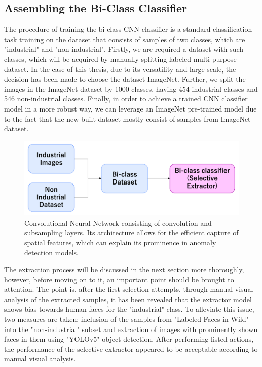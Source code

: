 \subsection{Assembling the Bi-Class Classifier}
\label{bi-class assemble}
The procedure of training the bi-class CNN classifier is a standard classification task training on the dataset that consists of samples of two classes, which are "industrial" and "non-industrial". Firstly, we are required a dataset with such classes, which will be acquired by manually splitting labeled multi-purpose dataset. In the case of this thesis, due to its versatility and large scale, the decision has been made to choose the dataset ImageNet. Further, we split the images in the ImageNet dataset by 1000 classes, having 454 industrial classes and 546 non-industrial classes. Finally, in order to achieve a trained CNN classifier model in a more robust way, we can leverage an ImageNet pre-trained model due to the fact that the new built dataset mostly consist of samples from ImageNet dataset.

\begin{figure}[t]
	\begin{center}
		\includegraphics[width=1.0\linewidth]{Chapter_3/cnn_train_data.png}
	\end{center}
	\caption{Convolutional Neural Network consisting of convolution and subsampling layers. Its architecture allows for the efficient capture of spatial features, which can explain its prominence in anomaly detection models.}
	\label{fig:cnn}
\end{figure} 	

The extraction process will be discussed in the next section more thoroughly, however, before moving on to it, an important point should be brought to attention. The point is, after the first selection attempts, through manual visual analysis of the extracted samples, it has been revealed that the extractor model shows bias towards human faces for the "industrial" class. To alleviate this issue, two measures are taken: inclusion of the samples from "Labeled Faces in Wild" into the "non-industrial" subset and extraction of images with prominently shown faces in them using "YOLOv5" object detection. After performing listed actions, the performance of the selective extractor appeared to be acceptable according to manual visual analysis.

